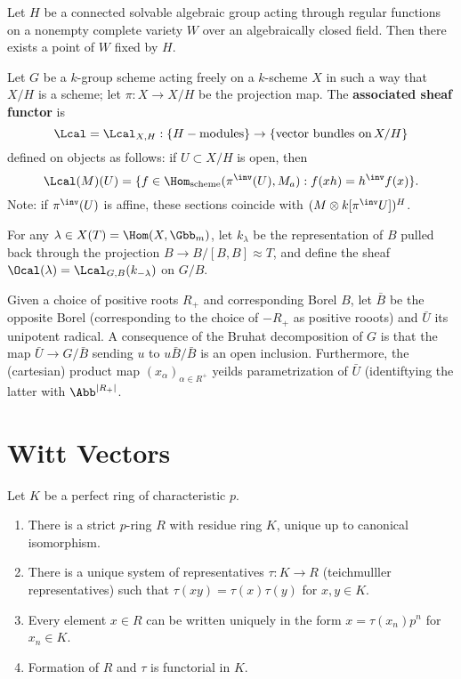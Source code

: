 \documentclass{amsart}
\begin{document}
\begin{thm}
  Let $H$ be a connected solvable algebraic group acting through regular functions on a nonempty complete variety $W$ over an algebraically closed field. Then there exists a point of $W$ fixed by $H$.
\end{thm}

\begin{definition}\label{def:associated-sheaf}
  Let $G$ be a $k$-group scheme acting freely on a $k$-scheme $X$ in such a way that $X/H$ is a scheme; let $\pi: X \to X/H$ be the projection map. The \textbf{associated sheaf functor} is
  \[ \Lcal=\Lcal_{X,H} : \{H -\text{modules}\} \to \{\text{vector bundles on} \, X/H\} \]
  defined on objects as follows: if $U \subset X/H$ is open, then
  \[\Lcal(M)(U) = \{ f \in \Hom_{\text{scheme}}(\pi^\inv (U), M_a) : f(xh) = h^\inv f(x)\}. \]
  Note: if $\pi^\inv(U)$ is affine, these sections coincide with $(M \otimes k[\pi^\inv U])^H$.
\end{definition}


For any $\lambda \in X(T)=\Hom(X,\Gbb_m)$, let $k_\lambda$ be the representation of $B$ pulled back through the projection $B \to B/[B,B] \approx T$, and define the sheaf $\Ocal(\lambda) = \Lcal_{G,B}(k_{-\lambda})$ on $G/B$.

Given a choice of positive roots $R_+$ and corresponding Borel $B$, let $\bar{B}$ be the opposite Borel (corresponding to the choice of $-R_+$ as positive rooots) and $\bar{U}$ its unipotent radical. A consequence of the Bruhat decomposition of $G$ is that the map $\bar{U} \to G / \bar{B}$ sending $u$ to $u\bar{B}/\bar{B}$ is an open inclusion. Furthermore, the (cartesian) product map $(x_\alpha)_{\alpha \in R^+}$ yeilds parametrization of $\bar{U}$ (identiftying the latter with $\Abb^{|R_+|}$.


\section{Witt Vectors}
\begin{thm}
  Let $K$ be a perfect ring of characteristic $p$.
  \begin{enumerate}
    \item There is a strict $p$-ring $R$ with residue ring $K$, unique up to canonical isomorphism.
    \item There is a unique system of representatives $\tau : K \to R$ (teichmulller representatives) such that $\tau(xy)=\tau(x)\tau(y)$ for $x,y\in K$.
    \item Every element $x \in  R$ can be written uniquely in the form $x = \tau(x_n) p^n$ for $x_n \in K$.
    \item Formation of $R$ and $\tau$ is functorial in $K$.
  \end{enumerate}
\end{thm}
\end{document}
